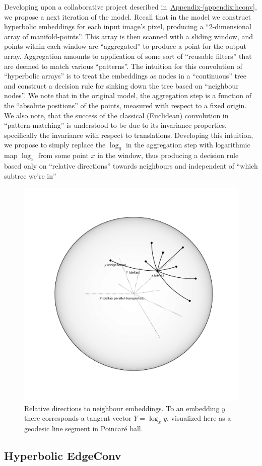 Developing upon a collaborative project described
in~\hyperref[appendix:hconv]{Appendix-\ref*{appendix:hconv}}, we propose a next
iteration of the model. Recall that in the model we construct hyperbolic
embeddings for each input image's pixel, producing a ``\( 2 \)-dimensional
array of manifold-points''. This array is then scanned with a sliding window,
and points within each window are ``aggregated'' to produce a point for the
output array. Aggregation amounts to application of some sort of ``reusable
filters'' that are deemed to match various ``patterns''. The intuition for this convolution
of ``hyperbolic arrays'' is to treat the embeddings as nodes in a ``continuous'' tree
and construct a decision rule for sinking down the tree based on ``neighbour nodes''.
We note that in the original model, the aggregation step is a function of the
``absolute positions'' of the points, measured with respect to a fixed origin.
We also note, that the success of the classical (Euclidean) convolution in
``pattern-matching'' is understood to be due to its invariance properties,
specifically the invariance with respect to translations. Developing this intuition,
we propose to simply replace the \( \log_0 \) in the aggregation step
with logarithmic map \( \log_x \) from some point \( x \) in the window, thus
producing a decision rule based only on ``relative directions'' towards neighbours
and independent of ``which subtree we're in''

\begin{figure}[ht]\center
\includegraphics[width=.5\textwidth]{art/neighbours.pdf}
\caption{Relative directions to neighbour embeddings. To an embedding \( y \)
there corresponds a tangent vector \( Y = \log_x y \), visualized here as a
geodesic line segment in Poincar\'e ball.}
\end{figure}

\subsection{Hyperbolic EdgeConv} \label{sec:hedgeconv}

